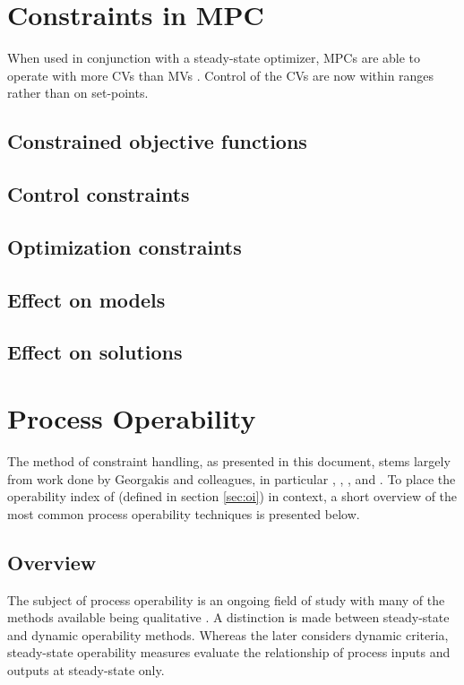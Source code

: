 \section{Constraints in MPC}
When used in conjunction with a steady-state optimizer, MPCs are able to operate
with more CVs than MVs \citet{vinsonphd}. Control of the CVs are now within
ranges rather than on set-points.
\subsection{Constrained objective functions}\label{sec:conobjfn}
\subsection{Control constraints}
\subsection{Optimization constraints}

\subsection{Effect on models}
\subsection{Effect on solutions}

\section{Process Operability}
The method of constraint handling, as presented in this document, stems largely
from work done by Georgakis and colleagues, in particular \citet{vinsonphd},
\citet{vinsonartoi}, \citet{limaphd}, \citet{opconproc} and \citet{opidealrx}.
To place the operability index of \citet{vinsonphd} (defined in section
\ref{sec:oi}) in context, a short overview of the most common process 
operability techniques is presented below.
\subsection{Overview}
The subject of process operability is an ongoing field of study with many of
the methods available being qualitative \citep[164]{skogestad}. A distinction
is made between steady-state and dynamic operability methods. Whereas the later
considers dynamic criteria, steady-state operability measures evaluate the
relationship of process inputs and outputs at steady-state only.
